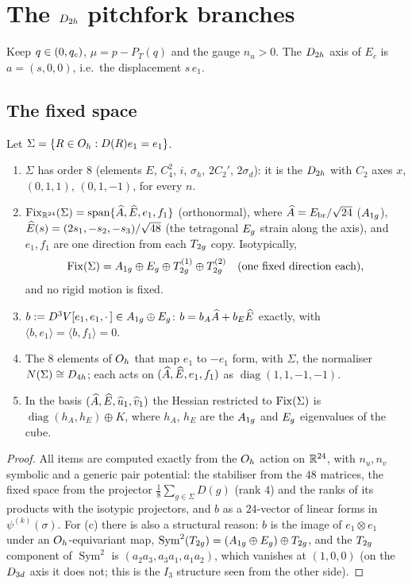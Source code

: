 \section{The $D_{2h}$ pitchfork branches}\label{sec:d2h}

Keep $q\in(0,q_{c})$, $\mu=p-P_T(q)$ and the gauge $n_u>0$. The $D_{2h}$ axis of $E_c$ is $a=(s,0,0)$, i.e.\ the
displacement $s\,e_1$.

\subsection{The fixed space}

\begin{lemma}\label{lem:fix}
Let $\Sigma=\{R\in O_{h}:D(R)e_1=e_1\}$.
\begin{enumerate}[label=(\alph*)]
\item $\Sigma$ has order $8$ (elements $E$, $C_4^2$, $i$, $\sigma_h$, $2C_2'$, $2\sigma_d$): it is the $D_{2h}$ with
$C_2$ axes $x$, $(0,1,1)$, $(0,1,-1)$, for every $n$.
\item $\operatorname{Fix}_{\mathbb{R}^{24}}(\Sigma)=\operatorname{span}\{\widehat{A},\widehat{E},e_1,f_1\}$ (orthonormal), where $\widehat{A}=E_{\mathrm{br}}/\sqrt{24}$
($A_{1g}$), $\widehat{E}(s)=(2s_1,-s_2,-s_3)/\sqrt{48}$ (the tetragonal $E_{g}$ strain along the axis), and $e_1,f_1$ are one
direction from each $T_{2g}$ copy. Isotypically,
\[
\operatorname{Fix}(\Sigma)=A_{1g}\oplus E_{g}\oplus T_{2g}^{(1)}\oplus T_{2g}^{(2)}\quad(\text{one fixed direction each}),
\]
and no rigid motion is fixed.
\item $b:=D^3V[e_1,e_1,\cdot\,]\in A_{1g}\oplus E_{g}$: $b=b_A\widehat{A}+b_E\widehat{E}$ exactly, with $\langle b,e_1\rangle=\langle b,f_1\rangle=0$.
\item The $8$ elements of $O_{h}$ that map $e_1$ to $-e_1$ form, with $\Sigma$, the normaliser $N(\Sigma)\cong D_{4h}$; each
acts on $(\widehat{A},\widehat{E},e_1,f_1)$ as $\operatorname{diag}(1,1,-1,-1)$.
\item In the basis $(\widehat{A},\widehat{E},\widehat{u}_1,\widehat{v}_1)$ the Hessian restricted to $\operatorname{Fix}(\Sigma)$ is $\operatorname{diag}(h_A,h_E)\oplus K$,
where $h_A$, $h_E$ are the $A_{1g}$ and $E_{g}$ eigenvalues of the cube.
\end{enumerate}
\end{lemma}
\begin{proof}
All items are computed exactly from the $O_{h}$ action on $\mathbb{R}^{24}$, with $n_u,n_v$ symbolic and a generic pair
potential: the stabiliser from the $48$ matrices, the fixed space from the projector $\frac18\sum_{g\in\Sigma}D(g)$ (rank
$4$) and the ranks of its products with the isotypic projectors, and $b$ as a $24$-vector of linear forms in
$\psi^{(k)}(\sigma)$. For (c) there is also a structural reason: $b$ is the image of $e_1\otimes e_1$ under an
$O_{h}$-equivariant map, $\operatorname{Sym}^2(T_{2g})=(A_{1g}\oplus E_{g})\oplus T_{2g}$, and the $T_{2g}$ component of
$\operatorname{Sym}^2$ is $(a_2a_3,a_3a_1,a_1a_2)$, which vanishes at $(1,0,0)$ (on the $D_{3d}$ axis it does not; this
is the $I_3$ structure seen from the other side).
\end{proof}

